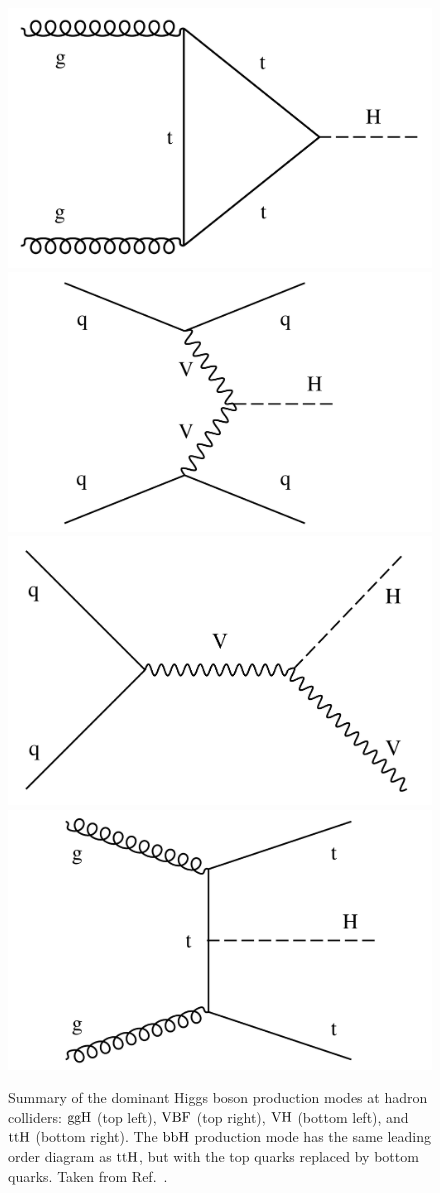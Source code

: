 \begin{figure}[hbtp]
  \begin{center}
    \includegraphics[width=0.35\linewidth]{img/theory/grandcomb/ggh.pdf}
    \includegraphics[width=0.35\linewidth]{img/theory/grandcomb/vbf.pdf}
    \includegraphics[width=0.35\linewidth]{img/theory/grandcomb/vh.pdf}
    \includegraphics[width=0.35\linewidth]{img/theory/grandcomb/tth.pdf}
    \caption{
        Summary of the dominant Higgs boson production modes at hadron colliders: $\mathrm{g}\mathrm{g}\mathrm{H}$ (top left), $\text{VBF}$ (top right), $\mathrm{V}\mathrm{H}$ (bottom left), and $\mathrm{t}\mathrm{t}\mathrm{H}$ (bottom right).
        The $\mathrm{b}\mathrm{b}\mathrm{H}$ production mode has the same leading order diagram as $\mathrm{t}\mathrm{t}\mathrm{H}$, but with the top quarks replaced by bottom quarks.
        Taken from Ref.~\cite{Sirunyan:2018koj}.
        }
    \label{fig:productionmodes}
  \end{center}
\end{figure}


